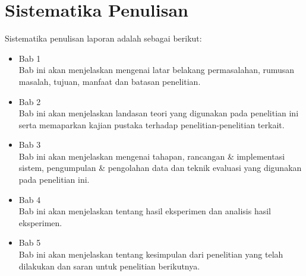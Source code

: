\section{Sistematika Penulisan}
Sistematika penulisan laporan adalah sebagai berikut:
\begin{itemize}
	\item Bab 1 \babSatu \\
	Bab ini akan menjelaskan mengenai latar belakang permasalahan, rumusan
masalah, tujuan, manfaat dan batasan penelitian.
	
	\item Bab 2 \babDua \\
	Bab ini akan menjelaskan landasan teori yang digunakan pada penelitian ini serta memaparkan kajian pustaka terhadap penelitian-penelitian terkait.
	
	\item Bab 3 \babTiga \\
	Bab ini akan menjelaskan mengenai tahapan, rancangan \& implementasi sistem, pengumpulan \& pengolahan data dan teknik evaluasi yang digunakan pada penelitian ini.
	
	\item Bab 4 \babEmpat \\
	Bab ini akan menjelaskan tentang hasil eksperimen dan analisis hasil
eksperimen.
	
	\item Bab 5 \babLima \\
	Bab ini akan menjelaskan tentang kesimpulan dari penelitian yang telah
dilakukan dan saran untuk penelitian berikutnya.
\end{itemize}

